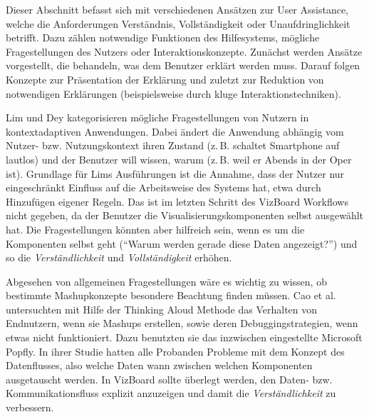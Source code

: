 \documentclass[
	headsepline,
	footsepline,
	fontsize=12pt,
	bibliography=totoc
]{scrbook}
\begin{document}
Dieser Abschnitt befasst sich mit verschiedenen Ansätzen zur User Assistance, welche die Anforderungen Verständnis, Vollständigkeit oder Unaufdringlichkeit betrifft. Dazu zählen notwendige Funktionen des Hilfesystems, mögliche Fragestellungen des Nutzers oder Interaktionskonzepte. Zunächst werden Ansätze vorgestellt, die behandeln, was dem Benutzer erklärt werden muss. Darauf folgen Konzepte zur Präsentation der Erklärung und zuletzt zur Reduktion von notwendigen Erklärungen (beispielsweise durch kluge Interaktionstechniken).



Lim und Dey \cite{Lim2009} kategorisieren mögliche Fragestellungen von Nutzern in kontextadaptiven Anwendungen. Dabei ändert die Anwendung abhängig vom Nutzer- bzw. Nutzungskontext ihren Zustand (z.\,B. schaltet Smartphone auf lautlos) und der Benutzer will wissen, warum (z.\,B. weil er Abends in der Oper ist). Grundlage für Lims Ausführungen ist die Annahme, dass der Nutzer nur eingeschränkt Einfluss auf die Arbeitsweise des Systems hat, etwa durch Hinzufügen eigener Regeln. Das ist im letzten Schritt des VizBoard Workflows nicht gegeben, da der Benutzer die Visualisierungskomponenten selbst ausgewählt hat. Die Fragestellungen könnten aber hilfreich sein, wenn es um die Komponenten selbst geht (\enquote{Warum werden gerade diese Daten angezeigt?}) und so die \emph{Verständlichkeit} und \emph{Vollständigkeit} erhöhen.


Abgesehen von allgemeinen Fragestellungen wäre es wichtig zu wissen, ob bestimmte Mashupkonzepte besondere Beachtung finden müssen. Cao et al. \cite{Cao2010} untersuchten mit Hilfe der Thinking Aloud Methode \cite{vanSomeren1994} das Verhalten von Endnutzern, wenn sie Mashups erstellen, sowie deren Debuggingstrategien, wenn etwas nicht funktioniert. Dazu benutzten sie das inzwischen eingestellte Microsoft Popfly. In ihrer Studie hatten alle Probanden Probleme mit dem Konzept des Datenflusses, also welche Daten wann zwischen welchen Komponenten ausgetauscht werden. In VizBoard sollte überlegt werden, den Daten- bzw. Kommunikationsfluss explizit anzuzeigen und damit die \emph{Verständlichkeit} zu verbessern.

\end{document}
